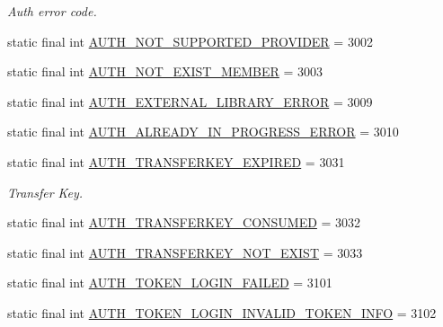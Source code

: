 \begin{DoxyCompactItemize}
\begin{DoxyCompactList}\small\item\em Auth error code. \end{DoxyCompactList}\item 
static final int \hyperlink{classcom_1_1toast_1_1android_1_1gamebase_1_1base_1_1_gamebase_error_af7ba4284e36585835a9b8dec2298b3b8}{A\+U\+T\+H\+\_\+\+N\+O\+T\+\_\+\+S\+U\+P\+P\+O\+R\+T\+E\+D\+\_\+\+P\+R\+O\+V\+I\+D\+ER} = 3002
\item 
static final int \hyperlink{classcom_1_1toast_1_1android_1_1gamebase_1_1base_1_1_gamebase_error_a29b702ab8a898ddbdc0267bf0cad142e}{A\+U\+T\+H\+\_\+\+N\+O\+T\+\_\+\+E\+X\+I\+S\+T\+\_\+\+M\+E\+M\+B\+ER} = 3003
\item 
static final int \hyperlink{classcom_1_1toast_1_1android_1_1gamebase_1_1base_1_1_gamebase_error_a47a8fc5c51b5a41ec4863fc65d821e91}{A\+U\+T\+H\+\_\+\+E\+X\+T\+E\+R\+N\+A\+L\+\_\+\+L\+I\+B\+R\+A\+R\+Y\+\_\+\+E\+R\+R\+OR} = 3009
\item 
static final int \hyperlink{classcom_1_1toast_1_1android_1_1gamebase_1_1base_1_1_gamebase_error_acc991240d46353185b547cf92e599cd7}{A\+U\+T\+H\+\_\+\+A\+L\+R\+E\+A\+D\+Y\+\_\+\+I\+N\+\_\+\+P\+R\+O\+G\+R\+E\+S\+S\+\_\+\+E\+R\+R\+OR} = 3010
\item 
static final int \hyperlink{classcom_1_1toast_1_1android_1_1gamebase_1_1base_1_1_gamebase_error_ae683f8f3e23ec9edc1ceea37164538ae}{A\+U\+T\+H\+\_\+\+T\+R\+A\+N\+S\+F\+E\+R\+K\+E\+Y\+\_\+\+E\+X\+P\+I\+R\+ED} = 3031
\begin{DoxyCompactList}\small\item\em Transfer Key. \end{DoxyCompactList}\item 
static final int \hyperlink{classcom_1_1toast_1_1android_1_1gamebase_1_1base_1_1_gamebase_error_a9028653c72cd7d656434f9f2b87945ae}{A\+U\+T\+H\+\_\+\+T\+R\+A\+N\+S\+F\+E\+R\+K\+E\+Y\+\_\+\+C\+O\+N\+S\+U\+M\+ED} = 3032
\item 
static final int \hyperlink{classcom_1_1toast_1_1android_1_1gamebase_1_1base_1_1_gamebase_error_aac410b488eb24bb74e30b464090b52c5}{A\+U\+T\+H\+\_\+\+T\+R\+A\+N\+S\+F\+E\+R\+K\+E\+Y\+\_\+\+N\+O\+T\+\_\+\+E\+X\+I\+ST} = 3033
\item 
static final int \hyperlink{classcom_1_1toast_1_1android_1_1gamebase_1_1base_1_1_gamebase_error_aaae26d8e17568a291fa6cdbd2d114eac}{A\+U\+T\+H\+\_\+\+T\+O\+K\+E\+N\+\_\+\+L\+O\+G\+I\+N\+\_\+\+F\+A\+I\+L\+ED} = 3101
\item 
static final int \hyperlink{classcom_1_1toast_1_1android_1_1gamebase_1_1base_1_1_gamebase_error_a9840976e9e86bd14afe85b34daed8778}{A\+U\+T\+H\+\_\+\+T\+O\+K\+E\+N\+\_\+\+L\+O\+G\+I\+N\+\_\+\+I\+N\+V\+A\+L\+I\+D\+\_\+\+T\+O\+K\+E\+N\+\_\+\+I\+N\+FO} = 3102

\end{DoxyCompactItemize}
